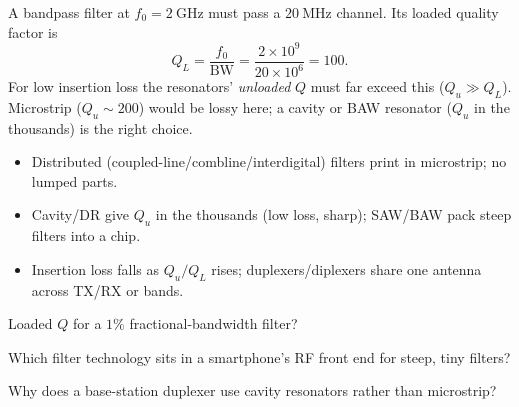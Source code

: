 \begin{workedexample}
A bandpass filter at $f_0 = 2\ \text{GHz}$ must pass a $20\ \text{MHz}$
channel. Its loaded quality factor is
\[ Q_L = \frac{f_0}{\text{BW}} = \frac{2\times10^{9}}{20\times10^{6}} = 100. \]
For low insertion loss the resonators' \emph{unloaded} $Q$ must far exceed this
($Q_u \gg Q_L$). Microstrip ($Q_u\!\sim\!200$) would be lossy here; a cavity or
BAW resonator ($Q_u$ in the thousands) is the right choice.
\end{workedexample}

\begin{keytakeaways}
\begin{itemize}[leftmargin=1.4em,itemsep=2pt]
\item Distributed (coupled-line/combline/interdigital) filters print in microstrip; no lumped parts.
\item Cavity/DR give $Q_u$ in the thousands (low loss, sharp); SAW/BAW pack steep filters into a chip.
\item Insertion loss falls as $Q_u/Q_L$ rises; duplexers/diplexers share one antenna across TX/RX or bands.
\end{itemize}
\end{keytakeaways}

\begin{exercises}
\item Loaded $Q$ for a $1\%$ fractional-bandwidth filter?
\item Which filter technology sits in a smartphone's RF front end for steep, tiny filters?
\item Why does a base-station duplexer use cavity resonators rather than microstrip?
\end{exercises}

